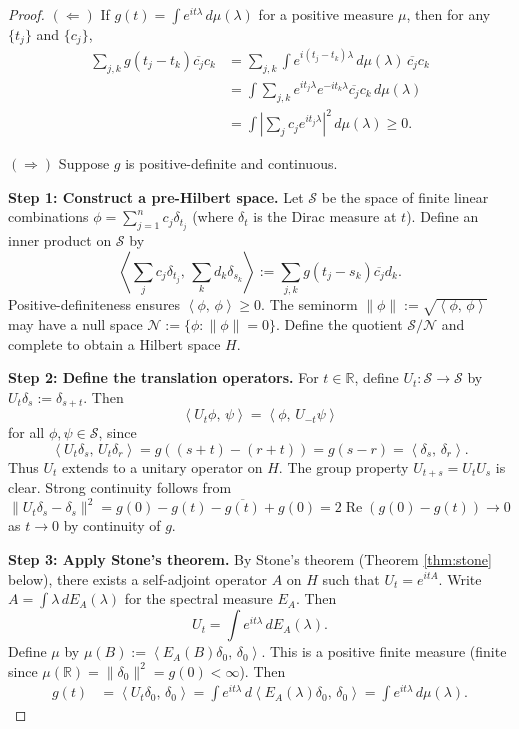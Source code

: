 \documentclass[11pt]{article}
\theoremstyle{definition}
\theoremstyle{remark}
\newcommand{\R}{\mathbb{R}}
\newcommand{\1}{\mathbbm{1}}
\newcommand{\ip}[2]{\left\langle #1,\,#2 \right\rangle}
\DeclareMathOperator{\re}{Re}
\begin{document}
\begin{proof}
$(\Leftarrow)$ If $g(t)=\int e^{it\lambda}\,d\mu(\lambda)$ for a positive measure $\mu$, then for any $\{t_j\}$ and $\{c_j\}$,
\begin{align*}
\sum_{j,k}g(t_j-t_k)\overline{c_j}c_k&=\sum_{j,k}\int e^{i(t_j-t_k)\lambda}\,d\mu(\lambda)\,\overline{c_j}c_k\\
&=\int\sum_{j,k}e^{it_j\lambda}e^{-it_k\lambda}\overline{c_j}c_k\,d\mu(\lambda)\\
&=\int\left|\sum_j c_je^{it_j\lambda}\right|^2\,d\mu(\lambda)\geq 0.
\end{align*}

$(\Rightarrow)$ Suppose $g$ is positive-definite and continuous. 

\textbf{Step 1: Construct a pre-Hilbert space.}
Let $\mathcal{S}$ be the space of finite linear combinations $\phi=\sum_{j=1}^n c_j\delta_{t_j}$ (where $\delta_t$ is the Dirac measure at $t$). Define an inner product on $\mathcal{S}$ by
\[
\ip{\sum_j c_j\delta_{t_j}}{\sum_k d_k\delta_{s_k}}:=\sum_{j,k}g(t_j-s_k)\overline{c_j}d_k.
\]
Positive-definiteness ensures $\ip{\phi}{\phi}\geq 0$. The seminorm $\|\phi\|:=\sqrt{\ip{\phi}{\phi}}$ may have a null space $\mathcal{N}:=\{\phi:\|\phi\|=0\}$. Define the quotient $\mathcal{S}/\mathcal{N}$ and complete to obtain a Hilbert space $H$.

\textbf{Step 2: Define the translation operators.}
For $t\in\R$, define $U_t:\mathcal{S}\to\mathcal{S}$ by $U_t\delta_s:=\delta_{s+t}$. Then
\[
\ip{U_t\phi}{\psi}=\ip{\phi}{U_{-t}\psi}
\]
for all $\phi,\psi\in\mathcal{S}$, since
\[
\ip{U_t\delta_s}{U_t\delta_r}=g((s+t)-(r+t))=g(s-r)=\ip{\delta_s}{\delta_r}.
\]
Thus $U_t$ extends to a unitary operator on $H$. The group property $U_{t+s}=U_tU_s$ is clear. Strong continuity follows from $\|U_t\delta_s-\delta_s\|^2=g(0)-g(t)-\overline{g(t)}+g(0)=2\re(g(0)-g(t))\to 0$ as $t\to 0$ by continuity of $g$.

\textbf{Step 3: Apply Stone's theorem.}
By Stone's theorem (Theorem \ref{thm:stone} below), there exists a self-adjoint operator $A$ on $H$ such that $U_t=e^{itA}$. Write $A=\int\lambda\,dE_A(\lambda)$ for the spectral measure $E_A$. Then
\[
U_t=\int e^{it\lambda}\,dE_A(\lambda).
\]
Define $\mu$ by $\mu(B):=\ip{E_A(B)\delta_0}{\delta_0}$. This is a positive finite measure (finite since $\mu(\R)=\|\delta_0\|^2=g(0)<\infty$). Then
\begin{align*}
g(t)&=\ip{U_t\delta_0}{\delta_0}=\int e^{it\lambda}\,d\ip{E_A(\lambda)\delta_0}{\delta_0}=\int e^{it\lambda}\,d\mu(\lambda).
\end{align*}
\end{proof}
\end{document}
